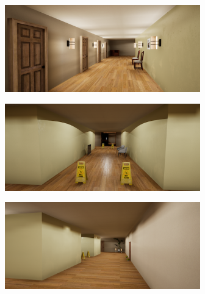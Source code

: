 \begin{figure}[H]
    \centering
    \begin{subfigure}[b]{0.48\textwidth}
        \centering
        \includegraphics[width=\textwidth]{resources/png/03/indoor-corridor/1.png}
        \vspace{0.25em}
    \end{subfigure}
    \hfill
    \begin{subfigure}[b]{0.48\textwidth}
        \centering
        \includegraphics[width=\textwidth]{resources/png/03/indoor-corridor/2.png}
        \vspace{0.25em}
    \end{subfigure}
    \begin{subfigure}[b]{0.48\textwidth}
        \centering
        \includegraphics[width=\textwidth]{resources/png/03/indoor-corridor/3.png}

\end{subfigure}
\end{figure}
